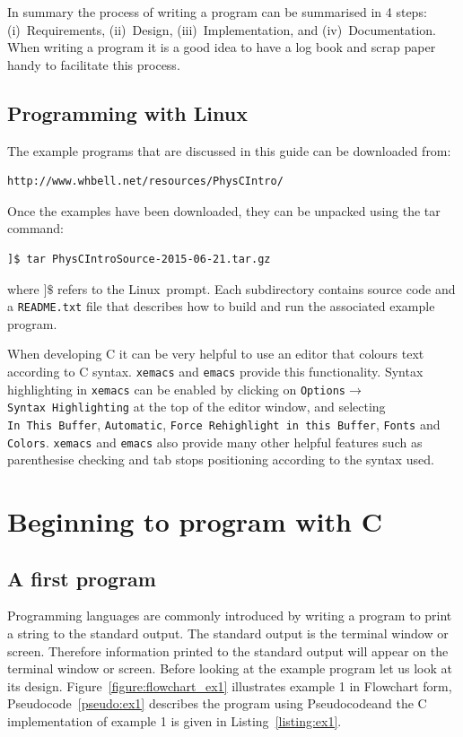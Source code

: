 \documentclass[11pt]{scrartcl}
\def\psc{Pseudocode}
\def\flo{Flowchart}
\def\linux{Linux}
\begin{document}
In summary the process of writing a program can be summarised in 4
steps: (i)~Requirements, (ii)~Design, (iii)~Implementation, and 
(iv)~Documentation.  When writing a program it is a good idea to have
a log book and scrap paper handy to facilitate this process.

\subsection{Programming with Linux}
The example programs that are discussed in this guide can be downloaded from:
\begin{verbatim}
http://www.whbell.net/resources/PhysCIntro/
\end{verbatim}
Once the examples have been downloaded, they can be unpacked using the tar command:
\begin{verbatim}
]$ tar PhysCIntroSource-2015-06-21.tar.gz
\end{verbatim} %
where \texttt{$]\$$} refers to the \linux\ prompt.  Each subdirectory contains source code and a \texttt{README.txt} file that describes how to build and run the associated example program.

When developing C it can be very helpful to use an editor that colours
text according to C syntax.  \texttt{xemacs} and \texttt{emacs} provide this
functionality.  Syntax highlighting in \texttt{xemacs} can be enabled by
clicking on \texttt{Options$\rightarrow$Syntax~Highlighting} at the
top of the editor window, and selecting \texttt{In~This~Buffer},
\texttt{Automatic}, \texttt{Force~Rehighlight~in~this~Buffer},
\texttt{Fonts} and \texttt{Colors}.  \texttt{xemacs} and
\texttt{emacs} also provide 
many other helpful features such as parenthesise checking and tab stops
positioning according to the syntax used.


\section{Beginning to program with C}

\subsection{A first program}

Programming languages are commonly introduced by writing a program to
print a string to the standard output.  The standard output is the
terminal window or screen.  Therefore information printed to the
standard output will appear on the terminal window or screen.  Before
looking at the example program let us look at its design.
Figure~\ref{figure:flowchart_ex1} illustrates example 1 in \flo
form, \psc~\ref{pseudo:ex1} describes the program using
\psc and the C implementation of example 1 is given in
Listing~\ref{listing:ex1}.
\end{document}
